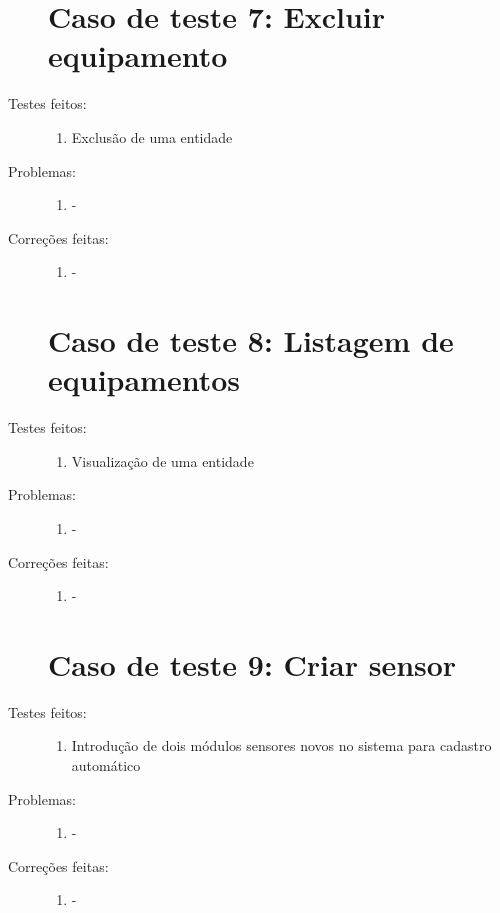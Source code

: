 \begin{description}
  \section{Caso de teste 7: Excluir equipamento}
  \item[Testes feitos:]
  \begin{enumerate}
    \item{Exclusão de uma entidade}
  \end{enumerate}
  \item[Problemas:]
  \begin{enumerate}
    \item{-}
  \end{enumerate}
  \item[Correções feitas:]
  \begin{enumerate}
    \item{-}
  \end{enumerate}

  \section{Caso de teste 8: Listagem de equipamentos}
  \item[Testes feitos:]
  \begin{enumerate}
    \item{Visualização de uma entidade}
  \end{enumerate}
  \item[Problemas:]
  \begin{enumerate}
    \item{-}
  \end{enumerate}
  \item[Correções feitas:]
  \begin{enumerate}
    \item{-}
  \end{enumerate}

  \section{Caso de teste 9: Criar sensor}
  \item[Testes feitos:]
  \begin{enumerate}
    \item{Introdução de dois módulos sensores novos no sistema para cadastro automático}
  \end{enumerate}
  \item[Problemas:]
  \begin{enumerate}
    \item{-}
  \end{enumerate}
  \item[Correções feitas:]
  \begin{enumerate}
    \item{-}
  \end{enumerate}  


\end{description}
